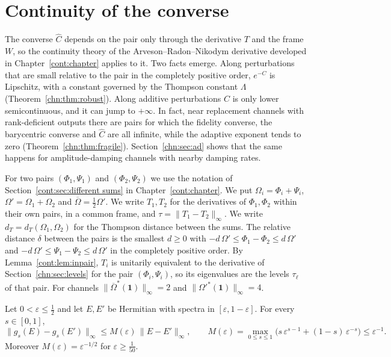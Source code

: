 \section{Continuity of the converse}\label{chn:sec:cont}

The converse $\widehat C$ depends on the pair only through the derivative $T$ and the frame $W$, so the continuity theory of the Arveson--Radon--Nikodym derivative developed in Chapter~\ref{cont:chapter} applies to it. Two facts emerge. Along perturbations that are small relative to the pair in the completely positive order, $e^{-\widehat C}$ is Lipschitz, with a constant governed by the Thompson constant $\Lambda$ (Theorem~\ref{chn:thm:robust}). Along additive perturbations $\widehat C$ is only lower semicontinuous, and it can jump to $+\infty$. In fact, near replacement channels with rank-deficient outputs there are pairs for which the fidelity converse, the barycentric converse and $\widehat C$ are all infinite, while the adaptive exponent tends to zero (Theorem~\ref{chn:thm:fragile}). Section~\ref{chn:sec:ad} shows that the same happens for amplitude-damping channels with nearby damping rates.

For two pairs $(\Phi_1,\Psi_1)$ and $(\Phi_2,\Psi_2)$ we use the notation of Section~\ref{cont:sec:different sums} in Chapter~\ref{cont:chapter}. We put $\Omega_i=\Phi_i+\Psi_i$, $\Omega'=\Omega_1+\Omega_2$ and $\overline\Omega=\frac12\Omega'$. We write $T_1,T_2$ for the derivatives of $\Phi_1,\Phi_2$ within their own pairs, in a common frame, and $\tau=\|T_1-T_2\|_\infty$. We write $d_T=d_T(\Omega_1,\Omega_2)$ for the Thompson distance between the sums. The relative distance $\delta$ between the pairs is the smallest $d\ge0$ with $-d\,\Omega'\le\Phi_1-\Phi_2\le d\,\Omega'$ and $-d\,\Omega'\le\Psi_1-\Psi_2\le d\,\Omega'$ in the completely positive order. By Lemma~\ref{cont:lem:inpair}, $T_i$ is unitarily equivalent to the derivative of Section~\ref{chn:sec:levels} for the pair $(\Phi_i,\Psi_i)$, so its eigenvalues are the levels $\tau_\ell$ of that pair. For channels $\|\overline\Omega^*(\mathbf 1)\|_\infty=2$ and $\|\Omega'^*(\mathbf 1)\|_\infty=4$.

\begin{lemma}\label{chn:lem:unif lip}
Let $0<\varepsilon\le\frac12$ and let $E,E'$ be Hermitian with spectra in $[\varepsilon,1-\varepsilon]$. For every $s\in[0,1]$,
\[
\|g_s(E)-g_s(E')\|_\infty\le M(\varepsilon)\,\|E-E'\|_\infty,\qquad M(\varepsilon)=\max_{0\le s\le1}\big(s\,\varepsilon^{s-1}+(1-s)\,\varepsilon^{-s}\big)\le\varepsilon^{-1}.
\]
Moreover $M(\varepsilon)=\varepsilon^{-1/2}$ for $\varepsilon\ge\frac1{50}$.
\end{lemma}

